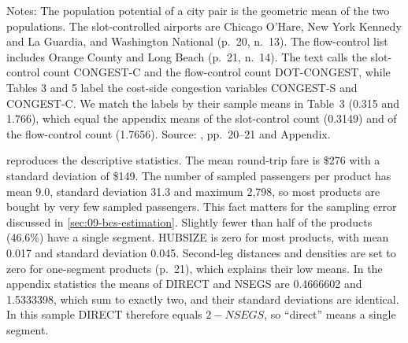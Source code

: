 \begin{table}[htbp]
\begin{threeparttable}
\begin{tabularx}{\textwidth}{@{}>{\raggedright\arraybackslash}p{2.2cm}>{\raggedright\arraybackslash}X
  >{\raggedright\arraybackslash}p{2.6cm}@{}}
\bottomrule
\end{tabularx}
\begin{tablenotes}\footnotesize
\item Notes: The population potential of a city pair is the geometric mean of the two populations. The
slot-controlled airports are Chicago O'Hare, New York Kennedy and La Guardia, and Washington National
(p.~20, n.~13). The flow-control list includes Orange County and Long Beach (p.~21, n.~14). The text calls
the slot-control count CONGEST-C and the flow-control count DOT-CONGEST, while Tables 3 and 5 label the
cost-side congestion variables CONGEST-S and CONGEST-C. We match the labels by their sample means in
Table~3 (0.315 and 1.766), which equal the appendix means of the slot-control count (0.3149) and of the
flow-control count (1.7656). Source: \citet{BerryCarnallSpiller1996}, pp.~20--21 and Appendix.
\end{tablenotes}
\end{threeparttable}
\end{table}

 reproduces the descriptive statistics. The mean round-trip fare is \$276 with a
standard deviation of \$149. The number of sampled passengers per product has mean 9.0, standard deviation
31.3 and maximum 2,798, so most products are bought by very few sampled passengers. This fact matters for
the sampling error discussed in \cref{sec:09-bcs-estimation}. Slightly fewer than half of the products
(46.6\%) have a single segment. HUBSIZE is zero for most products, with mean 0.017 and standard deviation
0.045. Second-leg distances and densities are set to zero for one-segment products (p.~21), which explains
their low means. In the appendix statistics the means of DIRECT and NSEGS are 0.4666602 and 1.5333398,
which sum to exactly two, and their standard deviations are identical. In this sample DIRECT therefore
equals $2-\mathit{NSEGS}$, so ``direct'' means a single segment.

